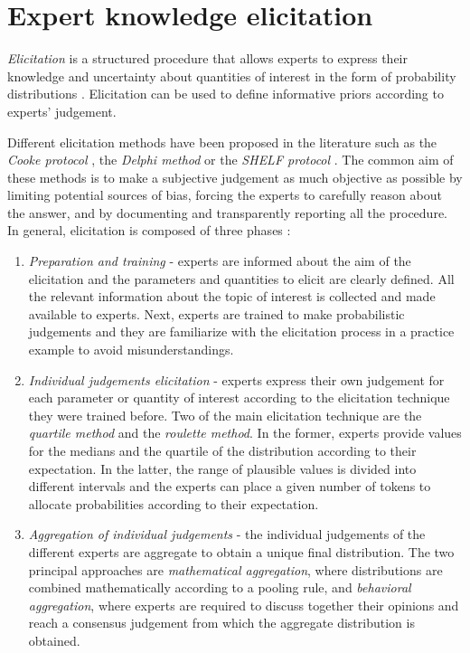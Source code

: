\documentclass[graybox]{svmult}
\begin{document}
\section{Expert knowledge elicitation}
\label{sec:expert_elicitation}

\emph{Elicitation} is a structured procedure that allows experts to express their knowledge and uncertainty about quantities of interest in the form of probability distributions \cite{ohaganExpertKnowledgeElicitation2019}. Elicitation can be used to define informative priors according to  experts' judgement.

Different elicitation methods have been proposed in the literature such as the \emph{Cooke protocol} \cite{cookeExpertsUncertaintyOpinion1991}, the \emph{Delphi method} \cite{roweDelphiTechniqueForecasting1999} or the \emph{SHELF protocol} \cite{oakleySHELFSheffieldElicitation2016}. The common aim of these methods is to make a subjective judgement as much objective as possible by limiting potential sources of bias, forcing the experts to carefully reason about the answer, and by documenting and transparently reporting all the procedure. In general, elicitation is composed of three phases \cite{ohaganUncertainJudgementsEliciting2006}:
\begin{enumerate}
	\item{\emph{Preparation and training} - experts are informed about  the aim of the elicitation and the parameters and quantities to elicit are clearly defined. All the relevant information about the topic of interest is collected and made available to experts. Next, experts are trained to make probabilistic judgements and they are familiarize with the elicitation process in a practice example to avoid misunderstandings. }
	\item{\emph{Individual judgements elicitation} - experts express their own judgement for each parameter or quantity of interest according to the elicitation technique they were trained before. Two of the main elicitation technique are the \emph{quartile method} and the \emph{roulette method}. In the former, experts provide values for the medians  and the quartile of the distribution according to their expectation. In the latter, the range of plausible values is divided into different intervals and the experts can place a given number of tokens to allocate probabilities according to  their expectation.}
	\item{\emph{Aggregation of individual judgements} - the individual judgements of the different experts are aggregate to obtain a unique final distribution. The two principal approaches are \emph{mathematical  aggregation}, where distributions are combined mathematically according to a pooling rule, and \emph{behavioral aggregation}, where experts are required to discuss together their opinions and reach a consensus judgement from which the aggregate distribution is obtained.}
\end{enumerate}
\end{document}
